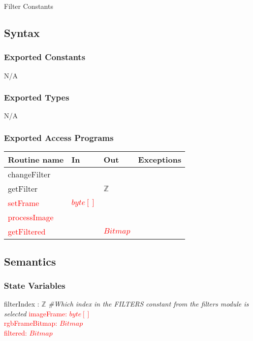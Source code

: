 \documentclass[12pt, titlepage]{article}
\begin{document}
Filter Constants

\subsection* {Syntax}

\subsubsection* {Exported Constants}

N/A


\subsubsection* {Exported Types}

N/A

\subsubsection* {Exported Access Programs}

\begin{tabular}{| l | l | l | l |}
\hline
\textbf{Routine name} & \textbf{In} & \textbf{Out} & \textbf{Exceptions}\\
\hline
changeFilter &  &  & \\
\hline
getFilter &  & $\mathbb{Z}$ & \\
\hline
\textcolor{red}{setFrame} & \textcolor{red}{$byte[]$} &  & \\
\hline
\textcolor{red}{processImage} & &  & \\
\hline
\textcolor{red}{getFiltered} & & \textcolor{red}{$Bitmap$} & \\
\hline

\end{tabular}

\subsection* {Semantics}

\subsubsection* {State Variables}

filterIndex : $\mathbb{Z}$ \textit{\#Which index in the FILTERS constant from the filters module is selected}
\textcolor{red}{
imageFrame: $byte []$   \\
rgbFrameBitmap: $Bitmap$ \\
filtered: $Bitmap$  \\
}
\end{document}
